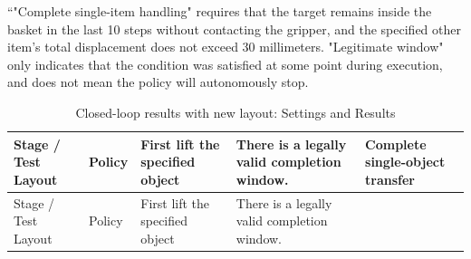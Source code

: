 ``"Complete single-item handling" requires that the target remains inside the basket in the last 10 steps without contacting the gripper, and the specified other item's total displacement does not exceed 30 millimeters. "Legitimate window" only indicates that the condition was satisfied at some point during execution, and does not mean the policy will autonomously stop.

\FloatBarrier\begingroup\small\setlength{\tabcolsep}{2.5pt}
\begin{longtable}[]{@{}
  >{\raggedright\arraybackslash}p{}
  >{\raggedright\arraybackslash}p{}
  >{\raggedright\arraybackslash}p{}
  >{\raggedright\arraybackslash}p{}
  >{\raggedright\arraybackslash}p{}@{}}
\caption{Closed-loop results with new layout: Settings and Results}\label{tab:s14-2}\tabularnewline
\toprule\noalign{}
\begin{minipage}[b]{\linewidth}\raggedright
Stage / Test Layout
\end{minipage} & \begin{minipage}[b]{\linewidth}\raggedright
Policy
\end{minipage} & \begin{minipage}[b]{\linewidth}\raggedright
First lift the specified object
\end{minipage} & \begin{minipage}[b]{\linewidth}\raggedright
There is a legally valid completion window.
\end{minipage} & \begin{minipage}[b]{\linewidth}\raggedright
Complete single-object transfer
\end{minipage} \\
\midrule\noalign{}
\endfirsthead
\toprule\noalign{}
\begin{minipage}[b]{\linewidth}\raggedright
Stage / Test Layout
\end{minipage} & \begin{minipage}[b]{\linewidth}\raggedright
Policy
\end{minipage} & \begin{minipage}[b]{\linewidth}\raggedright
First lift the specified object
\end{minipage} & \begin{minipage}[b]{\linewidth}\raggedright
There is a legally valid completion window.
\end{minipage} & \begin{minipage}[b]{\linewidth}\raggedright

\end{minipage}
\end{longtable}

